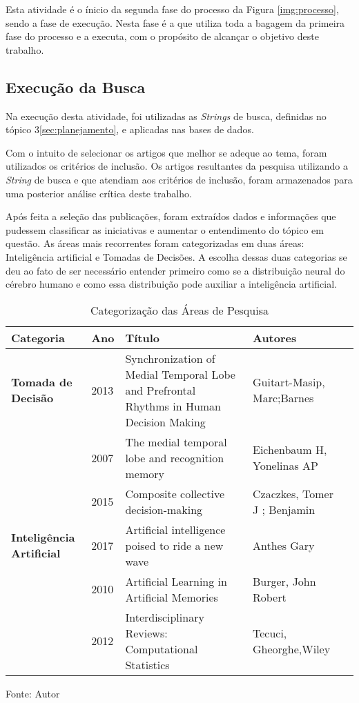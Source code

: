Esta atividade é o ínicio da segunda fase do processo da Figura \ref{img:processo}, sendo a fase de execução. Nesta fase é a que utiliza toda a bagagem da primeira fase do processo e a executa, com o propósito de alcançar o objetivo deste trabalho.

\subsection{Execução da Busca}
\label{subsec:busca}

Na execução desta atividade, foi utilizadas as \textit{Strings} de busca, definidas no tópico 3\ref{sec:planejamento}, e aplicadas nas bases de dados.

Com o intuito de selecionar os artigos que melhor se adeque ao tema, foram utilizados os critérios de inclusão. Os artigos resultantes da pesquisa utilizando a \textit{String} de busca e que atendiam aos critérios de inclusão, foram armazenados para uma posterior análise crítica deste trabalho.

Após feita a seleção das publicações, foram extraídos dados e informações que pudessem classificar as iniciativas e aumentar o entendimento do tópico em questão. As áreas mais recorrentes foram categorizadas em duas áreas: Inteligência artificial e Tomadas de Decisões. A escolha dessas duas categorias se deu ao fato de ser necessário entender primeiro como se a distribuição neural do cérebro humano e como essa distribuição pode auxiliar a inteligência artificial.

\begin{table}[h]
\centering
\begin{tabular}{ | l | l | p{5cm} | l | p{10cm} |}
\hline
\rowcolor[HTML]{F8FF00} 
{\color[HTML]{000000} \textbf{Categoria}} & \textbf{Ano} & \textbf{Título} & \textbf{Autores}        \\ \hline
{\cellcolor[HTML]{34FF34}}\textbf{Tomada de Decisão}               & 2013                   & Synchronization of Medial Temporal Lobe and Prefrontal Rhythms in Human Decision Making    & Guitart-Masip, Marc;Barnes          \\ \hline
 & 2007 & The medial temporal lobe and recognition memory & Eichenbaum H, Yonelinas AP\\ \hline
 & 2015 & Composite collective decision-making & Czaczkes, Tomer J ; Benjamin \\ \hline
 {\cellcolor[HTML]{34FF34}}\textbf{Inteligência Artificial} & 2017 & Artificial intelligence poised to ride a new wave & Anthes Gary \\ \hline
 & 2010 & Artificial Learning in Artificial Memories & Burger, John Robert \\ \hline
 & 2012 & Interdisciplinary Reviews: Computational Statistics & Tecuci, Gheorghe,Wiley \\ \hline
\end{tabular}
\caption{Categorização das Áreas de Pesquisa}
Fonte: Autor
\label{tab:categorizacao}
\end{table}